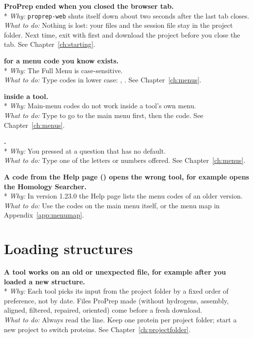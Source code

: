 {\bfseries ProPrep ended when you closed the browser tab.}\\*
\emph{Why:} \texttt{proprep-web} shuts itself down about two seconds after the
last tab closes.\\
\emph{What to do:} Nothing is lost: your files and the session file stay in
the project folder. Next time, exit with  first and download the
project before you close the tab. See Chapter~\ref{ch:starting}.

{\bfseries {} for a menu code
you know exists.}\\*
\emph{Why:} The Full Menu is case-sensitive.\\
\emph{What to do:} Type codes in lower case: , . See
Chapter~\ref{ch:menus}.

{\bfseries {}
inside a tool.}\\*
\emph{Why:} Main-menu codes do not work inside a tool's own menu.\\
\emph{What to do:} Type  to go to the main menu first, then the code.
See Chapter~\ref{ch:menus}.

{\bfseries {}.}\\*
\emph{Why:} You pressed  at a question that has no default.\\
\emph{What to do:} Type one of the letters or numbers offered. See
Chapter~\ref{ch:menus}.

{\bfseries A code from the Help page () opens the wrong tool, for
example  opens the Homology Searcher.}\\*
\emph{Why:} In version 1.23.0 the Help page lists the menu codes of an older
version.\\
\emph{What to do:} Use the codes on the main menu itself, or the menu map in
Appendix~\ref{app:menumap}.

\section{Loading structures}\label{sec:troubleshooting-loading}

{\bfseries A tool works on an old or unexpected file, for example
 after you loaded a new structure.}\\*
\emph{Why:} Each tool picks its input from the project folder by a fixed order
of preference, not by date. Files ProPrep made (without hydrogens, assembly,
aligned, filtered, repaired, oriented) come before a fresh download.\\
\emph{What to do:} Always read the  line. Keep one
protein per project folder; start a new project to switch proteins. See
Chapter~\ref{ch:projectfolder}.

